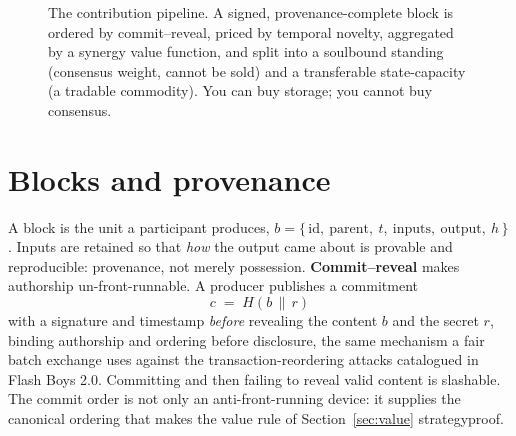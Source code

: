 \documentclass[10pt]{article}
\begin{document}
\begin{figure}[h]
\centering
{}
\caption{The contribution pipeline. A signed, provenance-complete block is ordered by commit--reveal,
priced by temporal novelty, aggregated by a synergy value function, and split into a
\textcolor{sb}{soulbound} standing (consensus weight, cannot be sold) and a \textcolor{tr}{transferable}
state-capacity (a tradable commodity). You can buy storage; you cannot buy consensus.}
\label{fig:pipeline}
\end{figure}

\section{Blocks and provenance}\label{sec:blocks}

A block is the unit a participant produces,
$b = \{\,\mathrm{id},\ \mathrm{parent},\ t,\ \mathrm{inputs},\ \mathrm{output},\ h\,\}$.
Inputs are retained so that \emph{how} the output came about is provable and reproducible: provenance,
not merely possession. \textbf{Commit--reveal} makes authorship un-front-runnable. A producer publishes
a commitment
\begin{equation}
c \;=\; H(b \,\|\, r)
\end{equation}
with a signature and timestamp \emph{before} revealing the content $b$ and the secret $r$, binding
authorship and ordering before disclosure, the same mechanism a fair batch exchange uses against the
transaction-reordering attacks catalogued in Flash Boys 2.0. Committing and then failing to reveal valid content is slashable. The commit order is
not only an anti-front-running device: it supplies the canonical ordering that makes the value rule of
Section~\ref{sec:value} strategyproof.
\end{document}
